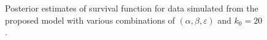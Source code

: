 \documentclass[
  sn-basic,
]{sn-jnl}
\theoremstyle{plain}
\theoremstyle{plain}
\theoremstyle{remark}
\begin{document}
\begin{figure}


\caption{\label{fig-rec1}Posterior estimates of survival function for
data simulated from the proposed model with various combinations of
\((\alpha,\beta,\varepsilon)\) and \(k_0=20\).}

\end{figure}%
\end{document}
